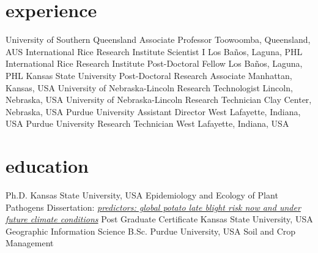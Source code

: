 \section*{experience}
\begin{entrylist}
    {University of Southern Queensland}
    {Associate Professor}
    {Toowoomba, Queensland, AUS}
    {International Rice Research Institute}
    {Scientist I}
    {Los Ba\~nos, Laguna, PHL}
    {International Rice Research Institute}
    {Post-Doctoral Fellow}
    {Los Ba\~nos, Laguna, PHL}
    {Kansas State University}
    {Post-Doctoral Research Associate}
    {Manhattan, Kansas, USA}
   {University of Nebraska-Lincoln}
   {Research Technologist}
   {Lincoln, Nebraska, USA}
   {University of Nebraska-Lincoln}
   {Research Technician}
   {Clay Center, Nebraska, USA}
   {Purdue University}
   {Assistant Director}
   {West Lafayette, Indiana, USA}
   {Purdue University}
   {Research Technician}
   {West Lafayette, Indiana, USA}
\end{entrylist}

\section*{education}\begin{entrylist}
    {Ph.D. {}}
    {Kansas State University, USA}
    {Epidemiology and Ecology of Plant Pathogens}
  \entry{}
  {Dissertation: }
  {}
    {\emph{\href{https://krex.k-state.edu/dspace/handle/2097/2341?show=full}{predictors: global potato late blight risk now and under future climate conditions}}}
    {Post Graduate Certificate {}}
    {Kansas State University, USA}
    {Geographic Information Science}
    {B.Sc. {}}
    {Purdue University, USA}
    {Soil and Crop Management}
\end{entrylist}

